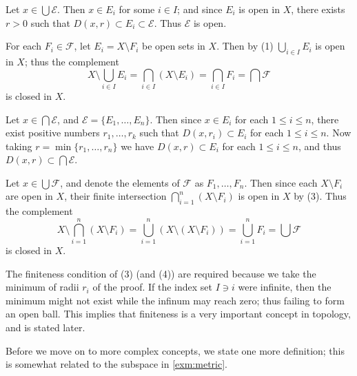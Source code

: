 \begin{myproof}
    \begin{nlist}
        \item Let \(x\in\bigcup\mathcal E\).
        Then \(x\in E_i\) for some \(i\in I\);
        and since \(E_i\) is open in \(X\),
        there exists \(r>0\) such that
        \(D(x,r)\subset E_i\subset\mathcal E\).
        Thus \(\mathcal E\) is open.

        \item For each \(F_i\in\mathcal F\),
        let \(E_i=X\setminus F_i\) be open sets in \(X\).
        Then by (1) \(\bigcup_{i\in I}E_i\) is open in \(X\);
        thus the complement
        \[
            X\setminus\bigcup_{i\in I}E_i
            =\bigcap_{i\in I}(X\setminus E_i)
            =\bigcap_{i\in I}F_i
            =\bigcap\mathcal F
        \]
        is closed in \(X\).

        \item Let \(x\in\bigcap\mathcal E\),
        and \(\mathcal E=\{E_1,\dots,E_n\}\).
        Then since \(x\in E_i\) for each \(1\le i\le n\),
        there exist positive numbers \(r_1,\dots,r_k\) such that
        \(D(x,r_i)\subset E_i\) for each \(1\le i\le n\).
        Now taking \(r=\min\{r_1,\dots,r_n\}\) we have
        \(D(x,r)\subset E_i\) for each \(1\le i\le n\),
        and thus \(D(x,r)\subset\bigcap\mathcal E\).

        \item Let \(x\in\bigcup\mathcal F\),
        and denote the elements of \(\mathcal F\) as
        \(F_1,\dots,F_n\).
        Then since each \(X\setminus F_i\) are open in \(X\),
        their finite intersection \(\bigcap_{i=1}^n(X\setminus F_i)\)
        is open in \(X\) by (3).
        Thus the complement
        \[
            X\setminus\bigcap_{i=1}^n(X\setminus F_i)
            =\bigcup_{i=1}^n(X\setminus(X\setminus F_i))
            =\bigcup_{i=1}^nF_i
            =\bigcup\mathcal F
        \]
        is closed in \(X\).
        \rightqed
    \end{nlist}
\end{myproof}

The finiteness condition of (3) (and (4)) are required
because we take the minimum of radii \(r_i\) of the proof.
If the index set \(I\ni i\) were infinite,
then the minimum might not exist while the infinum may reach zero;
thus failing to form an open ball.
This implies that finiteness is a very important concept in topology,
and is stated later.

Before we move on to more complex concepts,
we state one more definition;
this is somewhat related to the subspace in \cref{exm:metric}.

